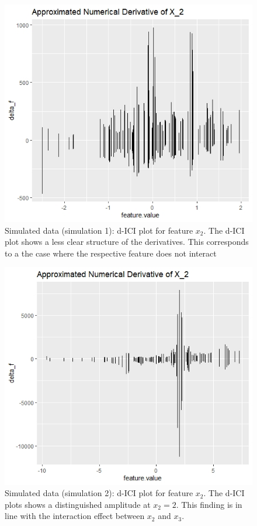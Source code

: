 \documentclass[
]{krantz}
\begin{document}
\begin{figure}

{\centering \includegraphics[width=0.75\linewidth]{images/03-7-3} 

}

\caption{Simulated data (simulation 1): d-ICI plot for feature $x_{2}$. The d-ICI plot shows a less clear structure of the derivatives. This corresponds to a the case where the respective feature does not interact}\label{fig:fig3}
\end{figure}
\begin{figure}

{\centering \includegraphics[width=0.75\linewidth]{images/03-7-4} 

}

\caption{Simulated data (simulation 2): d-ICI plot for feature $x_{2}$. The d-ICI plots shows a distinguished amplitude at $x_{2} = 2$. This finding is in line with the interaction effect between $x_{2}$ and $x_{3}$.}\label{fig:fig4}
\end{figure}
\end{document}
